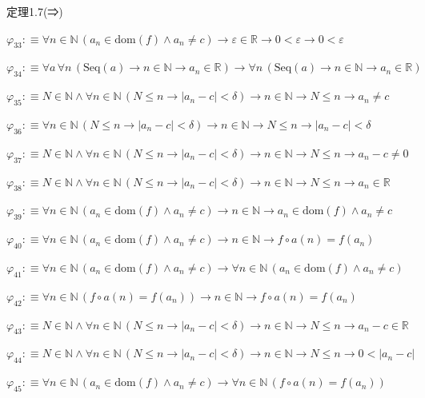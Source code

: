\begin{fullproof}{定理1.7(⇒)}
\begin{abbrevlist}
\item $\varphi_{33} :\equiv \forall n \in \mathbb{N}\,(a_{n} \in \mathrm{dom}(f) \land a_{n} \neq c) \to \varepsilon \in \mathbb{R} \to 0 < \varepsilon \to 0 < \varepsilon$
\item $\varphi_{34} :\equiv \forall a\,\forall n\,(\mathrm{Seq}(a) \to n \in \mathbb{N} \to a_{n} \in \mathbb{R}) \to \forall n\,(\mathrm{Seq}(a) \to n \in \mathbb{N} \to a_{n} \in \mathbb{R})$
\item $\varphi_{35} :\equiv N \in \mathbb{N} \land \forall n \in \mathbb{N}\,(N \leq n \to \lvert a_{n} - c \rvert < \delta) \to n \in \mathbb{N} \to N \leq n \to a_{n} \neq c$
\item $\varphi_{36} :\equiv \forall n \in \mathbb{N}\,(N \leq n \to \lvert a_{n} - c \rvert < \delta) \to n \in \mathbb{N} \to N \leq n \to \lvert a_{n} - c \rvert < \delta$
\item $\varphi_{37} :\equiv N \in \mathbb{N} \land \forall n \in \mathbb{N}\,(N \leq n \to \lvert a_{n} - c \rvert < \delta) \to n \in \mathbb{N} \to N \leq n \to a_{n} - c \neq 0$
\item $\varphi_{38} :\equiv N \in \mathbb{N} \land \forall n \in \mathbb{N}\,(N \leq n \to \lvert a_{n} - c \rvert < \delta) \to n \in \mathbb{N} \to N \leq n \to a_{n} \in \mathbb{R}$
\item $\varphi_{39} :\equiv \forall n \in \mathbb{N}\,(a_{n} \in \mathrm{dom}(f) \land a_{n} \neq c) \to n \in \mathbb{N} \to a_{n} \in \mathrm{dom}(f) \land a_{n} \neq c$
\item $\varphi_{40} :\equiv \forall n \in \mathbb{N}\,(a_{n} \in \mathrm{dom}(f) \land a_{n} \neq c) \to n \in \mathbb{N} \to f \circ a(n) = f(a_{n})$
\item $\varphi_{41} :\equiv \forall n \in \mathbb{N}\,(a_{n} \in \mathrm{dom}(f) \land a_{n} \neq c) \to \forall n \in \mathbb{N}\,(a_{n} \in \mathrm{dom}(f) \land a_{n} \neq c)$
\item $\varphi_{42} :\equiv \forall n \in \mathbb{N}\,(f \circ a(n) = f(a_{n})) \to n \in \mathbb{N} \to f \circ a(n) = f(a_{n})$
\item $\varphi_{43} :\equiv N \in \mathbb{N} \land \forall n \in \mathbb{N}\,(N \leq n \to \lvert a_{n} - c \rvert < \delta) \to n \in \mathbb{N} \to N \leq n \to a_{n} - c \in \mathbb{R}$
\item $\varphi_{44} :\equiv N \in \mathbb{N} \land \forall n \in \mathbb{N}\,(N \leq n \to \lvert a_{n} - c \rvert < \delta) \to n \in \mathbb{N} \to N \leq n \to 0 < \lvert a_{n} - c \rvert$
\item $\varphi_{45} :\equiv \forall n \in \mathbb{N}\,(a_{n} \in \mathrm{dom}(f) \land a_{n} \neq c) \to \forall n \in \mathbb{N}\,(f \circ a(n) = f(a_{n}))$

\end{abbrevlist}
\end{fullproof}
